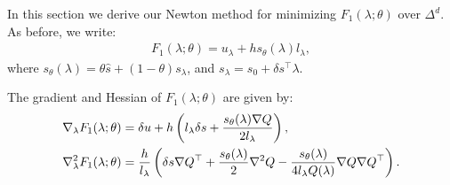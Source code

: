 \documentclass[eikonal.tex]{subfiles}
\begin{document}
In this section we derive our Newton method for minimizing
$F_1(\lambda; \theta)$ over $\Delta^d$. As before, we write:
\begin{align*}
  F_1(\lambda; \theta) = u_\lambda + h s_\theta(\lambda) l_\lambda,
\end{align*}
where $s_\theta(\lambda) = \theta \hat{s} + (1 - \theta) s_\lambda$,
and $s_\lambda = s_0 + \delta s^\top \lambda$.

\begin{lemma}
  The gradient and Hessian of $F_1(\lambda; \theta)$ are given by:
  \begin{align*}
    \nabla_\lambda F_1(\lambda; \theta) &= \delta u + h \left(l_\lambda \delta s + \frac{s_\theta(\lambda) \nabla Q}{2 l_\lambda}\right), \\
    \nabla_\lambda^2 F_1(\lambda; \theta) &= \frac{h}{l_\lambda} \left(\delta s \nabla Q^\top + \frac{s_\theta(\lambda)}{2} \nabla^2 Q - \frac{s_\theta(\lambda)}{4 l_\lambda Q(\lambda)} \nabla Q \nabla Q^\top\right).
  \end{align*}
\end{lemma}
\end{document}
